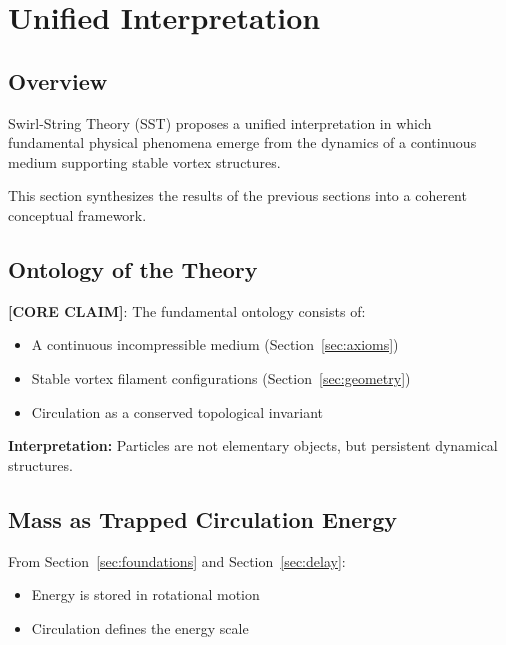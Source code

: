 \section{Unified Interpretation}
    \label{sec:unification}
    
    \subsection{Overview}
        
        Swirl-String Theory (SST) proposes a unified interpretation in which fundamental physical phenomena emerge from the dynamics of a continuous medium supporting stable vortex structures.
        
        This section synthesizes the results of the previous sections into a coherent conceptual framework.
    
    \subsection{Ontology of the Theory}
        
        \textbf{[CORE CLAIM]}:
        The fundamental ontology consists of:
        
        \begin{itemize}
            \item A continuous incompressible medium (Section~\ref{sec:axioms})
            \item Stable vortex filament configurations (Section~\ref{sec:geometry})
            \item Circulation as a conserved topological invariant
        \end{itemize}
        
        \textbf{Interpretation:}
        Particles are not elementary objects, but persistent dynamical structures.
    
    \subsection{Mass as Trapped Circulation Energy}
        
        From Section~\ref{sec:foundations} and Section~\ref{sec:delay}:
        
        \begin{itemize}
            \item Energy is stored in rotational motion
            \item Circulation defines the energy scale
        \end{itemize}
        
